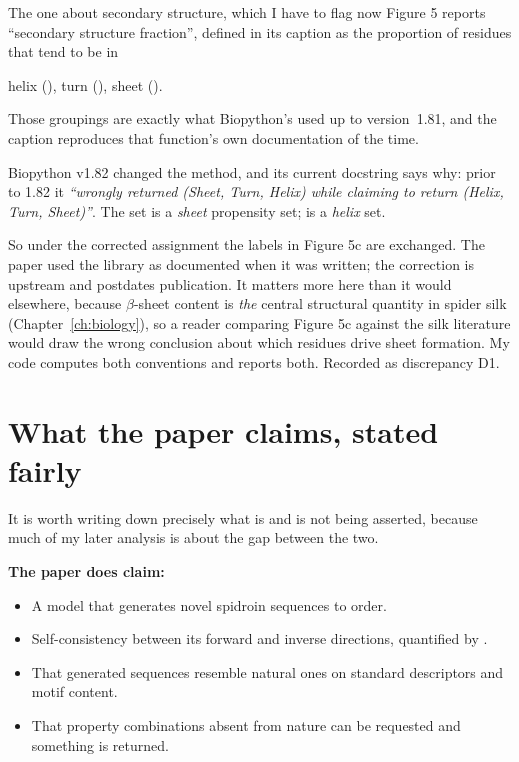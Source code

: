 \begin{keybox}{The one about secondary structure, which I have to flag now}
Figure 5 reports ``secondary structure fraction'', defined in its caption as
the proportion of residues that tend to be in
\begin{center}
helix (), \quad turn (), \quad sheet ().
\end{center}
Those groupings are exactly what Biopython's
 used up to version~1.81, and the caption
reproduces that function's own documentation of the time.

Biopython v1.82 changed the method, and its current docstring says why:
prior to 1.82 it \emph{``wrongly returned (Sheet, Turn, Helix) while claiming to
return (Helix, Turn, Sheet)''}. The set  is a \emph{sheet}
propensity set;  is a \emph{helix} set.

So under the corrected assignment the labels in Figure 5c are exchanged. The
paper used the library as documented when it was written; the correction is
upstream and postdates publication. It matters more here than it would
elsewhere, because $\beta$-sheet content is \emph{the} central structural
quantity in spider silk (Chapter~\ref{ch:biology}), so a reader comparing
Figure 5c against the silk literature would draw the wrong conclusion about
which residues drive sheet formation. My code computes both conventions and
reports both. Recorded as discrepancy D1.
\end{keybox}

\section{What the paper claims, stated fairly}

It is worth writing down precisely what is and is not being asserted, because
much of my later analysis is about the gap between the two.

\textbf{The paper does claim:}
\begin{itemize}[leftmargin=*,itemsep=1pt]
  \item A model that generates novel spidroin sequences to order.
  \item Self-consistency between its forward and inverse directions, quantified
        by \Rsq.
  \item That generated sequences resemble natural ones on standard descriptors
        and motif content.
  \item That property combinations absent from nature can be requested and
        something is returned.
\end{itemize}

